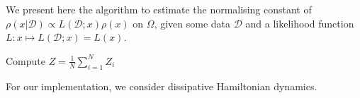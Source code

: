 We present here the algorithm to estimate the normalising constant of $\rho(x|\mathcal{D}) \propto L(\mathcal{D}; x)\rho(x)$ on $\Omega$, given some data $\mathcal{D}$ and a likelihood function $L:x\mapsto L(\mathcal{D}; x)= L(x)$.


\begin{algorithm}[H]
 Compute $Z=\tfrac{1}{N}\sum_{i=1}^{N}Z
_i$\;
 \;
\end{algorithm}

For our implementation, we consider dissipative Hamiltonian dynamics.

